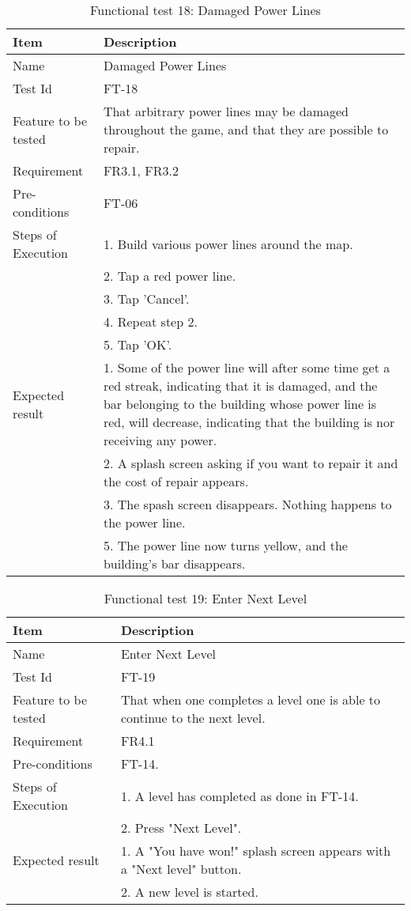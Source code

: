 \begin{table}[H]
\centering
	\begin{tabular}{ l | p{8cm} }
		\hline
		\rowcolor{lightgray}
		{\bf Item} & {\bf Description} \\ \hline
		Name & Damaged Power Lines \\ 
		Test Id & FT-18 \\ 
		Feature to be tested & That arbitrary power lines may be damaged throughout the game, and that they are possible to repair. \\ 
		Requirement & FR3.1, FR3.2  \\ 
		Pre-conditions & FT-06 \\ 
		Steps of Execution & 1. Build various power lines around the map. \\ 
		& 2. Tap a red power line. \\
		& 3. Tap 'Cancel'. \\
		& 4. Repeat step 2. \\
		& 5. Tap 'OK'. \\
		Expected result & 1. Some of the power line will after some time get a red streak, indicating that it is damaged, and the bar belonging to the building whose power line is red, will decrease, indicating that the building is nor receiving any power. \\
		& 2. A splash screen asking if you want to repair it and the cost of repair appears. \\
		& 3. The spash screen disappears. Nothing happens to the power line. \\
		& 5. The power line now turns yellow, and the building's bar disappears. \\
		\hline
	\end{tabular}
	\caption{Functional test 18: Damaged Power Lines}
\end{table}

\begin{table}[H]
\centering
	\begin{tabular}{ l | p{8cm} }
		\hline
		\rowcolor{lightgray}
		{\bf Item} & {\bf Description} \\ \hline
		Name & Enter Next Level \\ 
		Test Id & FT-19 \\ 
		Feature to be tested & That when one completes a level one is able to continue to the next level. \\ 
		Requirement & FR4.1 \\ 
		Pre-conditions & FT-14.\\ 
		Steps of Execution & 1. A level has completed as done in FT-14.\\
		& 2. Press "Next Level". \\
		Expected result & 1. A "You have won!" splash screen appears with a "Next level" button. \\
		& 2. A new level is started. \\
		\hline
	\end{tabular}
	\caption{Functional test 19: Enter Next Level}
\end{table}

